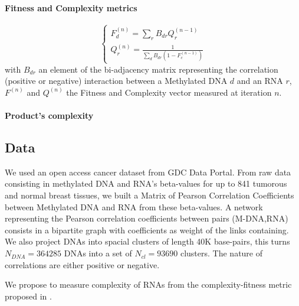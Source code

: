 \documentclass[10pt,a4paper]{article}
\begin{document}
\paragraph{Fitness and Complexity metrics}
\begin{equation}
\left\{
\begin{matrix}
F^{(n)}_{d} =  \sum_{r} B_{dr}Q^{(n-1)}_{r}\\
Q^{(n)}_{r} =  \frac{1}{\sum_{d}B_{dr}(1-F^{(n-1)}_{c})}
\end{matrix}
\right.
\end{equation}
with $B_{dr}$ an element of the bi-adjacency matrix representing the correlation (positive or negative) interaction between a Methylated DNA $d$ and an RNA $r$, $F^{(n)}$ and $Q^{(n)}$ the Fitness and Complexity vector measured at iteration $n$.
\paragraph{Product's complexity}
\subsection{Data}
We used an open access cancer dataset from GDC Data Portal. From raw data consisting in methylated DNA and RNA's beta-values for up to 841 tumorous and normal breast tissues, we built a Matrix of Pearson Correlation Coefficients between Methylated DNA and RNA from these beta-values. A network representing the Pearson correlation coefficients between pairs (M-DNA,RNA) consists in a bipartite graph with coefficients as weight of the links containing. We also project DNAs into spacial clusters of length 40K base-pairs, this turns $N_{DNA} = 364285$ DNAs into a set of $N_{cl} = 93690$ clusters. The nature of correlations are either positive or negative.

We propose to measure complexity of RNAs from the complexity-fitness metric proposed in \cite{tacchella12}.
\end{document}
